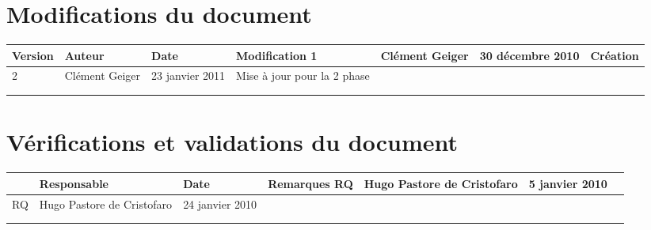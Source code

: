 
\section*{Modifications du document}

\begin{center}
\begin{longtable}{|m{14mm}||m{36mm}|m{36mm}|m{60mm}|}
\hline
Version & Auteur & Date & Modification\endhead \hline
1
& %
Clément Geiger
& %
30 décembre 2010
& %
Création
\\\hline
2
& %
Clément Geiger
& %
23 janvier 2011
& %
Mise à jour pour la 2 phase
\\\hline

& %

& %

& %

\\\hline

& %

& %

& %

\\\hline
\end{longtable}
\end{center}


\section*{Vérifications et validations du document}

\begin{center}
\begin{longtable}{|m{15mm}|m{36mm}|m{36mm}|m{60mm}|}
\hline
 & Responsable & Date & Remarques\endhead \hline
RQ
& %
Hugo Pastore de Cristofaro
& %
5 janvier 2010
& %

\\\hline
RQ
& %
Hugo Pastore de Cristofaro
& %
24 janvier 2010
& %

\\\hline

& %

& %

& %

\\\hline

& %

& %

& %

\\\hline
\end{longtable}
\end{center}

\pagebreak
